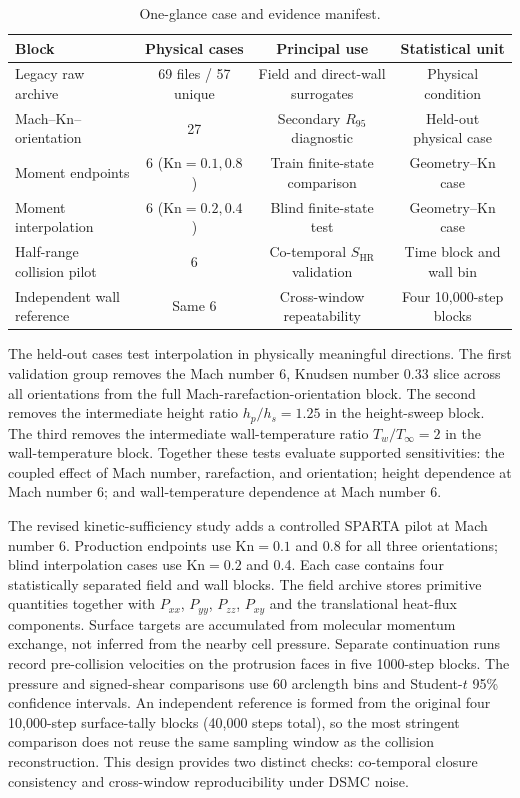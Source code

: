 \documentclass[aip,pof,preprint,notitlepage,floatfix,amsmath,amssymb]{revtex4-2}
\newcommand{\Kn}{\mathrm{Kn}}
\begin{document}
\begin{table}[h]
\centering
\caption{One-glance case and evidence manifest.}
\label{tab:evidence_manifest}
\small
\begin{tabular}{lccc}
\toprule
Block & Physical cases & Principal use & Statistical unit \\
\midrule
Legacy raw archive & 69 files / 57 unique & Field and direct-wall surrogates & Physical condition \\
Mach--$\Kn$--orientation & 27 & Secondary $R_{95}$ diagnostic & Held-out physical case \\
Moment endpoints & 6 ($\Kn=0.1,0.8$) & Train finite-state comparison & Geometry--$\Kn$ case \\
Moment interpolation & 6 ($\Kn=0.2,0.4$) & Blind finite-state test & Geometry--$\Kn$ case \\
Half-range collision pilot & 6 & Co-temporal $S_{\mathrm{HR}}$ validation & Time block and wall bin \\
Independent wall reference & Same 6 & Cross-window repeatability & Four 10,000-step blocks \\
\bottomrule
\end{tabular}
\end{table}


The held-out cases test interpolation in physically meaningful directions. The first validation group removes the Mach number $6$, Knudsen number $0.33$ slice across all orientations from the full Mach-rarefaction-orientation block. The second removes the intermediate height ratio $h_p/h_s=1.25$ in the height-sweep block. The third removes the intermediate wall-temperature ratio $T_w/T_\infty=2$ in the wall-temperature block. Together these tests evaluate supported sensitivities: the coupled effect of Mach number, rarefaction, and orientation; height dependence at Mach number $6$; and wall-temperature dependence at Mach number $6$.

The revised kinetic-sufficiency study adds a controlled SPARTA pilot at Mach number 6. Production endpoints use $\Kn=0.1$ and 0.8 for all three orientations; blind interpolation cases use $\Kn=0.2$ and 0.4. Each case contains four statistically separated field and wall blocks. The field archive stores primitive quantities together with $P_{xx}$, $P_{yy}$, $P_{zz}$, $P_{xy}$ and the translational heat-flux components. Surface targets are accumulated from molecular momentum exchange, not inferred from the nearby cell pressure. Separate continuation runs record pre-collision velocities on the protrusion faces in five 1000-step blocks. The pressure and signed-shear comparisons use 60 arclength bins and Student-$t$ 95\% confidence intervals. An independent reference is formed from the original four 10,000-step surface-tally blocks (40,000 steps total), so the most stringent comparison does not reuse the same sampling window as the collision reconstruction. This design provides two distinct checks: co-temporal closure consistency and cross-window reproducibility under DSMC noise.
\end{document}
